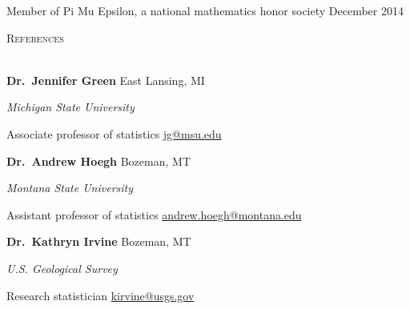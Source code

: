 \documentclass[a4paper]{article}
\newcommand{\lineunder} {
	\vspace*{-8pt} \\
	\hspace*{-18pt} \hrulefill \\
}
\newcommand{\header} [1] {
	{\hspace*{-18pt}\vspace*{6pt} \textsc{#1}}
	\vspace*{-6pt} \lineunder
}
\begin{document}
Member of Pi Mu Epsilon, a national mathematics honor society
\hfill December 2014

\vspace*{2mm}

\header{References}
\vspace*{2mm}

\textbf{Dr.~Jennifer Green} \hfill East Lansing, MI

\emph{Michigan State University}

Associate professor of statistics
\hfill \href{mailto:jg@msu.edu}{jg@msu.edu}

\vspace*{2mm}

\textbf{Dr.~Andrew Hoegh} \hfill Bozeman, MT

\emph{Montana State University}

Assistant professor of statistics
\hfill \href{mailto:andrew.hoegh@montana.edu}{andrew.hoegh@montana.edu}

\vspace*{2mm}

\textbf{Dr.~Kathryn Irvine} \hfill Bozeman, MT

\emph{U.S. Geological Survey}

Research statistician
\hfill \href{mailto:kirvine@usgs.gov}{kirvine@usgs.gov}

\vspace*{2mm}
\end{document}
